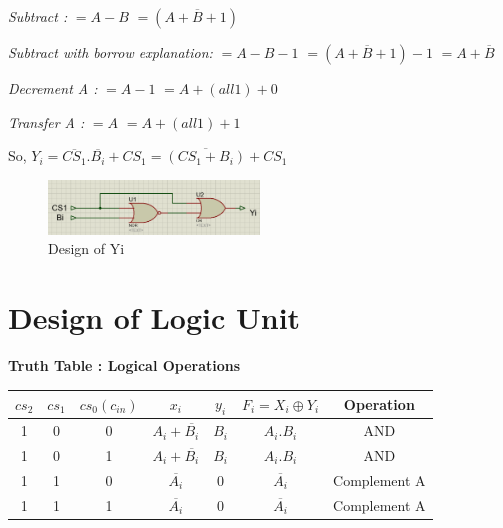 \documentclass[]{article}
\begin{document}
	
	\textit{Subtract : } \newline
	$=A-B$ \newline
	$=(A+\overline{B}+1)$ \newline
	\newline
	
	
	\textit{Subtract with borrow explanation:}\newline
	$=A-B-1$ \newline
	$=(A+\overline{B}+1)-1$ \newline
	$=A+\overline{B}$ \newline
	\newline
	
	\textit{Decrement A :}\newline
	$=A-1$ \newline
	$=A+(all 1) + 0 $ \newline
    \newline
	
	\textit{Transfer A :}\newline
	$=A$ \newline
	$=A+(all 1) + 1 $ \newline
	\newline
	
	
	So,
		$Y_i=\overline{CS_1}.\overline{B_i}+CS_1 = \overline{(CS_1+B_i)}+CS_1$
	\begin{figure}[h!]
		\centering
		\includegraphics[width = 0.5\textwidth]{Yi.PNG}
		\caption{Design of Yi}
		\label{fig:ckt1}
		
	\end{figure}
	
	\section{Design of Logic Unit}
	\textbf{Truth Table : Logical Operations}
		\begin{center}
		\begin{tabular}{ |c|c|c|c|c|c|c| } 
			\hline
			$cs_2$ & $cs_1$ & $cs_0(c_{in})$ & $x_i$ & $y_i$ & $F_i=X_i \oplus Y_i$ & Operation \\
			\hline
			
			\hline
			1 & 0 & 0 & $A_i+\overline{B_i}$ & $B_i$ & $A_i.B_i$ & AND \\
			\hline
			
			\hline
			1 & 0 & 1 & $A_i+\overline{B_i}$ & $B_i$ & $A_i.B_i$ & AND \\
			\hline
			
			\hline
			1 & 1 & 0 & $\overline{A_i}$ & $0$ & $\overline{A_i}$ & Complement A \\
			\hline
			
			\hline
			1 & 1 & 1 & $\overline{A_i}$ & $0$ & $\overline{A_i}$ & Complement A\\
			\hline
		\end{tabular}
	\end{center}
\end{document}
